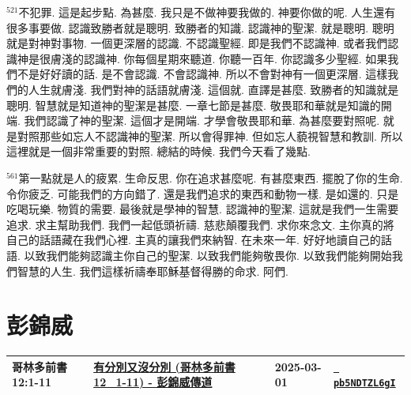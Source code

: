\documentclass{book}
\begin{document}
$^{521}$不犯罪.
這是起步點.
為甚麼.
我只是不做神要我做的.
神要你做的呢.
人生還有很多事要做.
認識致勝者就是聰明.
致勝者的知識.
認識神的聖潔.
就是聰明.
聰明就是對神對事物.
一個更深層的認識.
不認識聖經.
即是我們不認識神.
或者我們認識神是很膚淺的認識神.
你每個星期來聽道.
你聽一百年.
你認識多少聖經.
如果我們不是好好讀的話.
是不會認識.
不會認識神.
所以不會對神有一個更深層.
這樣我們的人生就膚淺.
我們對神的話語就膚淺.
這個就.
直譯是甚麼.
致勝者的知識就是聰明.
智慧就是知道神的聖潔是甚麼.
一章七節是甚麼.
敬畏耶和華就是知識的開端.
我們認識了神的聖潔.
這個才是開端.
才學會敬畏耶和華.
為甚麼要對照呢.
就是對照那些如忘人不認識神的聖潔.
所以會得罪神.
但如忘人藐視智慧和教訓.
所以這裡就是一個非常重要的對照.
總結的時候.
我們今天看了幾點.

$^{561}$第一點就是人的疲累.
生命反思.
你在追求甚麼呢.
有甚麼東西.
擺脫了你的生命.
令你疲乏.
可能我們的方向錯了.
還是我們追求的東西和動物一樣.
是如還的.
只是吃喝玩樂.
物質的需要.
最後就是學神的智慧.
認識神的聖潔.
這就是我們一生需要追求.
求主幫助我們.
我們一起低頭祈禱.
慈悲顛覆我們.
求你來念文.
主你真的將自己的話語藏在我們心裡.
主真的讓我們來納智.
在未來一年.
好好地讀自己的話語.
以致我們能夠認識主你自己的聖潔.
以致我們能夠敬畏你.
以致我們能夠開始我們智慧的人生.
我們這樣祈禱奉耶穌基督得勝的命求.
阿們.
\newpage



\chapter{彭錦威}\label{ch:preacher3}
\begin{multicols}{3}
\minitoc
\end{multicols}
{ \scriptsize


\begin{xltabular}{\textwidth}{|p{0.15\textwidth} p{0.6\textwidth}|p{0.07\textwidth} p{0.1\textwidth}|}
\hline
哥林多前書 12:1-11 & \hyperref[sec:pb5NDTZL6gI]{有分別又沒分別 (哥林多前書12\_1-11) - 彭錦威傳道} & 2025-03-01 & \href{https://youtube.com/watch?v=pb5NDTZL6gI}{\texttt{ pb5NDTZL6gI}} \\
\hline
\end{xltabular}
}
\newpage
\end{document}
